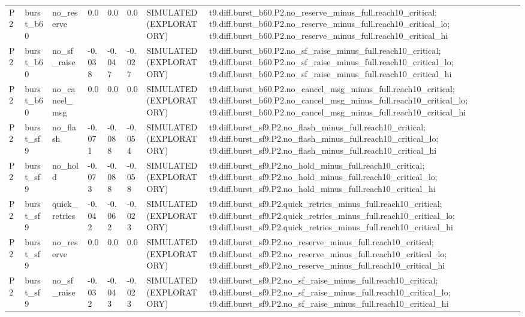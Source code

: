 \begin{table}[t]
\begin{tabular}{llllllll}
P2 & burst\_b60 & no\_reserve & 0.0 & 0.0 & 0.0 & SIMULATED (EXPLORATORY) & t9.diff.burst\_b60.P2.no\_reserve\_minus\_full.reach10\_critical; t9.diff.burst\_b60.P2.no\_reserve\_minus\_full.reach10\_critical\_lo; t9.diff.burst\_b60.P2.no\_reserve\_minus\_full.reach10\_critical\_hi \\
P2 & burst\_b60 & no\_sf\_raise & -0.038 & -0.047 & -0.027 & SIMULATED (EXPLORATORY) & t9.diff.burst\_b60.P2.no\_sf\_raise\_minus\_full.reach10\_critical; t9.diff.burst\_b60.P2.no\_sf\_raise\_minus\_full.reach10\_critical\_lo; t9.diff.burst\_b60.P2.no\_sf\_raise\_minus\_full.reach10\_critical\_hi \\
P2 & burst\_b60 & no\_cancel\_msg & 0.0 & 0.0 & 0.0 & SIMULATED (EXPLORATORY) & t9.diff.burst\_b60.P2.no\_cancel\_msg\_minus\_full.reach10\_critical; t9.diff.burst\_b60.P2.no\_cancel\_msg\_minus\_full.reach10\_critical\_lo; t9.diff.burst\_b60.P2.no\_cancel\_msg\_minus\_full.reach10\_critical\_hi \\
P2 & burst\_sf9 & no\_flash & -0.071 & -0.088 & -0.054 & SIMULATED (EXPLORATORY) & t9.diff.burst\_sf9.P2.no\_flash\_minus\_full.reach10\_critical; t9.diff.burst\_sf9.P2.no\_flash\_minus\_full.reach10\_critical\_lo; t9.diff.burst\_sf9.P2.no\_flash\_minus\_full.reach10\_critical\_hi \\
P2 & burst\_sf9 & no\_hold & -0.073 & -0.088 & -0.058 & SIMULATED (EXPLORATORY) & t9.diff.burst\_sf9.P2.no\_hold\_minus\_full.reach10\_critical; t9.diff.burst\_sf9.P2.no\_hold\_minus\_full.reach10\_critical\_lo; t9.diff.burst\_sf9.P2.no\_hold\_minus\_full.reach10\_critical\_hi \\
P2 & burst\_sf9 & quick\_retries & -0.042 & -0.062 & -0.023 & SIMULATED (EXPLORATORY) & t9.diff.burst\_sf9.P2.quick\_retries\_minus\_full.reach10\_critical; t9.diff.burst\_sf9.P2.quick\_retries\_minus\_full.reach10\_critical\_lo; t9.diff.burst\_sf9.P2.quick\_retries\_minus\_full.reach10\_critical\_hi \\
P2 & burst\_sf9 & no\_reserve & 0.0 & 0.0 & 0.0 & SIMULATED (EXPLORATORY) & t9.diff.burst\_sf9.P2.no\_reserve\_minus\_full.reach10\_critical; t9.diff.burst\_sf9.P2.no\_reserve\_minus\_full.reach10\_critical\_lo; t9.diff.burst\_sf9.P2.no\_reserve\_minus\_full.reach10\_critical\_hi \\
P2 & burst\_sf9 & no\_sf\_raise & -0.032 & -0.043 & -0.023 & SIMULATED (EXPLORATORY) & t9.diff.burst\_sf9.P2.no\_sf\_raise\_minus\_full.reach10\_critical; t9.diff.burst\_sf9.P2.no\_sf\_raise\_minus\_full.reach10\_critical\_lo; t9.diff.burst\_sf9.P2.no\_sf\_raise\_minus\_full.reach10\_critical\_hi \\

\end{tabular}
\end{table}
